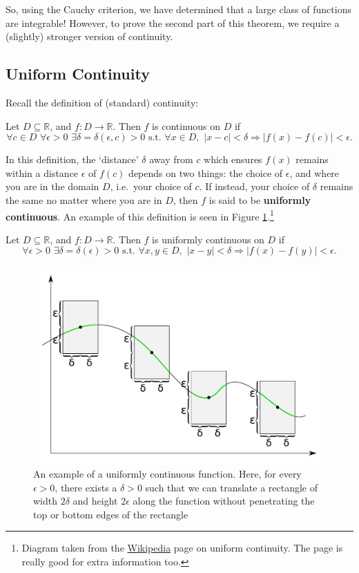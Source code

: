 \documentclass[
  17pt,
  a4paper]{extarticle}
\theoremstyle{plain}
\theoremstyle{definition}
\theoremstyle{plain}
\theoremstyle{plain}
\theoremstyle{plain}
\theoremstyle{plain}
\theoremstyle{definition}
\theoremstyle{definition}
\theoremstyle{remark}
\theoremstyle{remark}
\let\BeginKnitrBlock\begin \let\EndKnitrBlock\end
\renewcommand{\;}{\,}
\begin{document}
So, using the Cauchy criterion, we have determined that a large class of functions are integrable! However, to prove the second part of this theorem, we require a (slightly) stronger version of continuity.

\hypertarget{uniform-continuity}{%
\subsection{Uniform Continuity}\label{uniform-continuity}}

Recall the definition of (standard) continuity:

\BeginKnitrBlock{definition}[Continuity]
{\label{def:def3} }Let \(D \subseteq \mathbb{R}\), and \(f: D \to \mathbb{R}\). Then \(f\) is continuous on \(D\) if \[\forall c \in D\;\;\forall \epsilon > 0\;\;\exists \delta = \delta(\epsilon,c) > 0\;\;\text{s.t.}\;\;\forall x \in D,\;\; \lvert x - c \rvert < \delta \Rightarrow \lvert f(x) - f(c) \rvert < \epsilon.\]
\EndKnitrBlock{definition}

In this definition, the `distance' \(\delta\) away from \(c\) which ensures \(f(x)\) remains within a distance \(\epsilon\) of \(f(c)\) depends on two things: the choice of \(\epsilon\), and where you are in the domain \(D\), i.e.~your choice of \(c\). If instead, your choice of \(\delta\) remains the same no matter where you are in \(D\), then \(f\) is said to be \textbf{uniformly continuous}. An example of this definition is seen in Figure \ref{fig:unicont}.\footnote{Diagram taken from the \href{https://en.wikipedia.org/wiki/Uniform_continuity}{Wikipedia} page on uniform continuity. The page is really good for extra information too.}

\BeginKnitrBlock{definition}[Uniform Continuity]
{\label{def:def4} }Let \(D \subseteq \mathbb{R}\), and \(f: D \to \mathbb{R}\). Then \(f\) is uniformly continuous on \(D\) if \[\forall \epsilon > 0\;\;\exists \delta = \delta(\epsilon) > 0\;\;\text{s.t.}\;\;\forall x,y \in D,\;\; \lvert x - y \rvert < \delta \Rightarrow \lvert f(x) - f(y) \rvert < \epsilon.\]
\EndKnitrBlock{definition}

\begin{figure}

{\centering \includegraphics[width=0.5\linewidth]{UniCont} 

}

\caption{An example of a uniformly continuous function. Here, for every $\epsilon > 0$, there exists a $\delta > 0$ such that we can translate a rectangle of width $2\delta$ and height $2\epsilon$ along the function without penetrating the top or bottom edges of the rectangle}\label{fig:unicont}
\end{figure}
\end{document}
